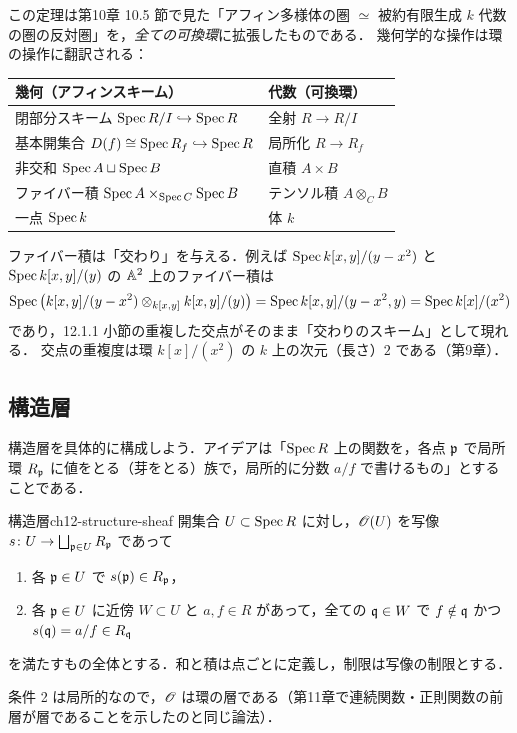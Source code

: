 この定理は第10章 10.5 節で見た「アフィン多様体の圏 $\simeq$ 被約有限生成 $k$ 代数の圏の反対圏」を，\emph{全ての可換環}に拡張したものである．
幾何学的な操作は環の操作に翻訳される：
\begin{center}
\begin{tabular}{ll}
  \hline
  幾何（アフィンスキーム） & 代数（可換環）\\
  \hline
  閉部分スキーム $\operatorname{Spec} R/I\hookrightarrow\operatorname{Spec} R$ & 全射 $R\to R/I$\\
  基本開集合 $D(f)\cong\operatorname{Spec} R_f\hookrightarrow\operatorname{Spec} R$ & 局所化 $R\to R_f$\\
  非交和 $\operatorname{Spec} A\sqcup\operatorname{Spec} B$ & 直積 $A\times B$\\
  ファイバー積 $\operatorname{Spec} A\times_{\operatorname{Spec} C}\operatorname{Spec} B$ & テンソル積 $A\otimes_CB$\\
  一点 $\operatorname{Spec} k$ & 体 $k$\\
  \hline
\end{tabular}
\end{center}
ファイバー積は「交わり」を与える．例えば $\operatorname{Spec} k[x,y]/(y-x^2)$ と $\operatorname{Spec} k[x,y]/(y)$ の $\mathbb{A}^2$ 上のファイバー積は
\[
  \operatorname{Spec}\big(k[x,y]/(y-x^2)\otimes_{k[x,y]}k[x,y]/(y)\big)=\operatorname{Spec} k[x,y]/(y-x^2,y)=\operatorname{Spec} k[x]/(x^2)
\]
であり，12.1.1 小節の重複した交点がそのまま「交わりのスキーム」として現れる．
交点の重複度は環 $k[x]/(x^2)$ の $k$ 上の次元（長さ）$2$ である（第9章）．

\subsection{構造層}

構造層を具体的に構成しよう．アイデアは「$\operatorname{Spec} R$ 上の関数を，各点 $\mathfrak{p}$ で局所環 $R_{\mathfrak{p}}$ に値をとる（芽をとる）族で，局所的に分数 $a/f$ で書けるもの」とすることである．

\begin{mydef}{構造層}{ch12-structure-sheaf}
開集合 $U\subset\operatorname{Spec} R$ に対し，$\mathscr{O}(U)$ を写像 $s\colon U\to\bigsqcup_{\mathfrak{p}\in U}R_{\mathfrak{p}}$ であって
\begin{enumerate}
  \item 各 $\mathfrak{p}\in U$ で $s(\mathfrak{p})\in R_{\mathfrak{p}}$，
  \item 各 $\mathfrak{p}\in U$ に近傍 $W\subset U$ と $a,f\in R$ があって，全ての $\mathfrak{q}\in W$ で $f\notin\mathfrak{q}$ かつ $s(\mathfrak{q})=a/f\in R_{\mathfrak{q}}$
\end{enumerate}
を満たすもの全体とする．和と積は点ごとに定義し，制限は写像の制限とする．
\end{mydef}

条件 2 は局所的なので，$\mathscr{O}$ は環の層である（第11章で連続関数・正則関数の前層が層であることを示したのと同じ論法）．

